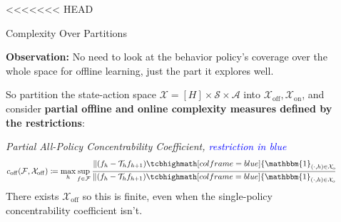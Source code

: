 \documentclass[final]{beamer}
\newcommand{\off}{\operatorname{off}}
\newcommand{\on}{\operatorname{on}}
\newcommand{\gX}{\mathcal{X}}
\newcommand{\gA}{\mathcal{A}}
\newcommand{\gS}{\mathcal{S}}
\newcommand{\gF}{\mathcal{F}}
\newcommand{\gT}{\mathcal{T}}
\newlength{\sepwidth}
\newlength{\colwidth}
\newcommand{\separatorcolumn}{\begin{column}{\sepwidth}\end{column}}
\begin{document}
\begin{frame}[t]
\begin{columns}[t]
\begin{column}{\colwidth}


\end{column}


\separatorcolumn

\begin{column}{\colwidth}

<<<<<<< HEAD
  \begin{block}{Complexity Over Partitions}

  \textbf{Observation:} No need to look at the behavior policy's coverage over the whole space for offline learning, just the part it explores well. 
  
  So partition the state-action space $\gX = [H] \times \gS \times \gA$ into $\gX_{\off}, \gX_{\on}$, and consider \textbf{partial offline and online complexity measures defined by the restrictions}:
  
    \textit{Partial All-Policy Concentrability Coefficient, \textcolor{blue}{restriction in blue}}
        $$c_{\off}(\gF, \gX_{\off}) 
    \coloneqq \max_h \sup_{f \in \gF} \frac{\|(f_h - \gT_h f_{h+1}) \tcbhighmath[colframe=blue]{\mathbbm{1}_{(\cdot, h) \in \gX_{\off}}}\|_{2, d_h^\pi}^2}{\|(f_h - \gT_h f_{h+1})\tcbhighmath[colframe=blue]{\mathbbm{1}_{(\cdot, h) \in \gX_{\off}}}\|_{2, \mu_{h}}^2}.$$
    {\small There exists $\gX_{\off}$ so this is finite, even when the single-policy concentrability coefficient isn't.}


\end{block}
\end{column}
\end{columns}
\end{frame}
\end{document}
